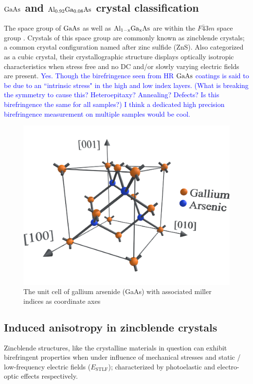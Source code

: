 \subsection{$\mathrm{GaAs}$ and $\mathrm{Al_{0.92}Ga_{0.08}As}$ crystal classification}
The space group of $\mathrm{GaAs}$ as well as $\mathrm{Al_{1-x}Ga_{x}As}$ are within the $F\bar{4}3m$ space group \cite{}. Crystals of this space group are commonly known as zincblende crystals; a common crystal configuration named after zinc sulfide (ZnS). Also categorized as a cubic crystal, their crystallographic structure displays optically isotropic characteristics when stress free and no DC and/or slowly varying electric fields are present.
 \textcolor{blue}{Yes. Though the birefringence seen from HR $\mathrm{GaAs}$ coatings is said to be due to an ``intrinsic stress" in the high and low index layers. (What is breaking the symmetry to cause this? Heteroepitaxy? Annealing? Defects? Is this birefringence the same for all samples?) I think a dedicated high precision birefringence measurement on multiple samples would be cool.}
\begin{figure}[!ht]
\begin{center}
\includegraphics[width=.5\textwidth]{figs/ALGAAS/gaas_unit_cell_mi.pdf}
\caption{The unit cell of gallium arsenide (GaAs) with associated miller indices as coordinate axes}
\end{center}
\label{fig:gaas_uc}
\end{figure}


\subsection{Induced anisotropy in zincblende crystals}
Zincblende structures, like the crystalline materials in question can exhibit birefringent properties when under influence of mechanical stresses and static / low-frequency electric fields ($E_\mathrm{STLF}$); characterized by photoelastic and electro-optic effects respectively. 

